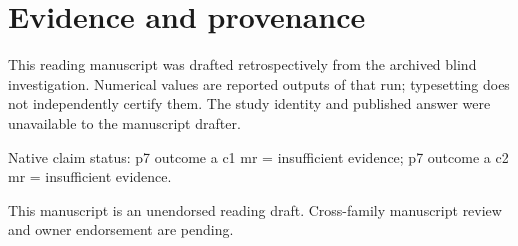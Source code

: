 \documentclass[10pt,a4paper]{article}
\begin{document}
\section*{Evidence and provenance}
This reading manuscript was drafted retrospectively from the archived blind investigation. Numerical values are reported outputs of that run; typesetting does not independently certify them. The study identity and published answer were unavailable to the manuscript drafter.
\par
Native claim status: p7 outcome a c1 mr = insufficient evidence; p7 outcome a c2 mr = insufficient evidence.
\par
This manuscript is an unendorsed reading draft. Cross-family manuscript review and owner endorsement are pending.
\par
\end{document}
